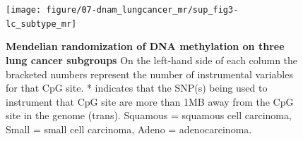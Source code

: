\documentclass[11pt,oneside]{bristolthesis}
\begin{document}
\begin{figure}

{\centering \texttt{[image: figure/07-dnam\_lungcancer\_mr/sup\_fig3-lc\_subtype\_mr]} 

}

\caption[Mendelian randomization of DNA methylation on three lung cancer subgroups]{\textbf{Mendelian randomization of DNA methylation on three lung cancer subgroups} On the left-hand side of each column the bracketed numbers represent the number of instrumental variables for that CpG site. * indicates that the SNP(s) being used to instrument that CpG site are more than 1MB away from the CpG site in the genome (trans). Squamous = squamous cell carcinoma, Small = small cell carcinoma, Adeno = adenocarcinoma.}\label{fig:sup-fig3-07}
\end{figure}
\begin{table}[!h]


\end{table}
\end{document}
